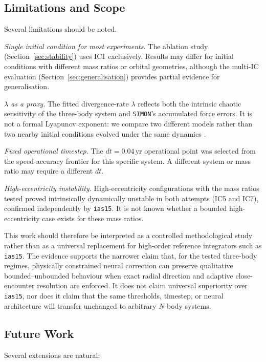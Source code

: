 \documentclass[12pt]{article}
\begin{document}
\subsection{Limitations and Scope}

Several limitations should be noted.

\textit{Single initial condition for most experiments.} The ablation study (Section~\ref{sec:stability}) uses IC1 exclusively. Results may differ for initial conditions with different mass ratios or orbital geometries, although the multi-IC evaluation (Section~\ref{sec:generalisation}) provides partial evidence for generalisation.

\textit{$\lambda$ as a proxy.} The fitted divergence-rate $\lambda$ reflects both the intrinsic chaotic sensitivity of the three-body system and \texttt{SIMON}'s accumulated force errors. It is not a formal Lyapunov exponent: we compare two different models rather than two nearby initial conditions evolved under the same dynamics \citep{sep-chaos}.

\textit{Fixed operational timestep.} The $dt = 0.04$\,yr operational point was selected from the speed-accuracy frontier for this specific system. A different system or mass ratio may require a different $dt$.

\textit{High-eccentricity instability.} High-eccentricity configurations with the mass ratios tested proved intrinsically dynamically unstable in both attempts (IC5 and IC7), confirmed independently by \texttt{ias15}. It is not known whether a bounded high-eccentricity case exists for these mass ratios.

This work should therefore be interpreted as a controlled methodological study rather
than as a universal replacement for high-order reference integrators such as
\texttt{ias15}. The evidence supports the narrower claim that, for the tested
three-body regimes, physically constrained neural correction can preserve qualitative
bounded--unbounded behaviour when exact radial direction and adaptive close-encounter
resolution are enforced. It does not claim universal superiority over \texttt{ias15},
nor does it claim that the same thresholds, timestep, or neural architecture will
transfer unchanged to arbitrary $N$-body systems.

\subsection{Future Work}

Several extensions are natural:
\end{document}
